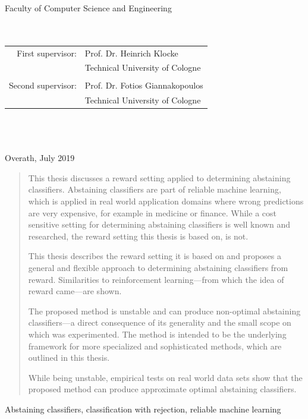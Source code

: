 \documentclass[twoside,11pt]{article}
\begin{document}
\begin{titlepage}
\begin{center}
\begin{large}
Faculty of Computer Science and Engineering
~\\
~\\
~\\
\begin{tabular}{rl}
  First supervisor: &Prof. Dr. Heinrich Klocke\\
                    &Technical University of Cologne\\
  &\\
  Second supervisor: &Prof. Dr. Fotios Giannakopoulos\\
                     &Technical University of Cologne
\end{tabular}
~\\
~\\
~\\
Overath, July 2019
\end{large}
\end{center}
\end{titlepage}

\begin{abstract}%
This thesis discusses a reward setting applied to
determining abstaining classifiers.
Abstaining classifiers are part of reliable machine
learning, which is applied in real world application
domains where wrong predictions are very expensive,
for example in medicine or finance.
While a cost sensitive setting for determining abstaining
classifiers is well known and researched, the reward
setting this thesis is based on, is not.

This thesis describes the reward setting it is based on and
proposes a general and flexible approach to determining
abstaining classifiers from reward.
Similarities to reinforcement learning---from which the
idea of reward came---are shown.

The proposed method is unstable and can produce non-optimal
abstaining classifiers---a direct consequence of its
generality and the small scope on which was experimented.
The method is intended to be the underlying framework
for more specialized and sophisticated methods, which are
outlined in this thesis.

While being unstable, empirical tests on real world data
sets show that the proposed method can produce approximate
optimal abstaining classifiers.
\end{abstract}

\begin{keywords}
Abstaining classifiers, classification with rejection,
reliable machine learning
\end{keywords}
\end{document}
